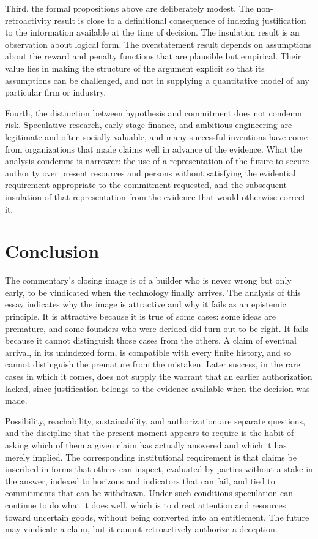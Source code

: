 \documentclass[11pt]{article}
\theoremstyle{plain}
\theoremstyle{definition}
\theoremstyle{remark}
\begin{document}
Third, the formal propositions above are deliberately modest. The non-retroactivity result is close to a definitional consequence of indexing justification to the information available at the time of decision. The insulation result is an observation about logical form. The overstatement result depends on assumptions about the reward and penalty functions that are plausible but empirical. Their value lies in making the structure of the argument explicit so that its assumptions can be challenged, and not in supplying a quantitative model of any particular firm or industry.

Fourth, the distinction between hypothesis and commitment does not condemn risk. Speculative research, early-stage finance, and ambitious engineering are legitimate and often socially valuable, and many successful inventions have come from organizations that made claims well in advance of the evidence. What the analysis condemns is narrower: the use of a representation of the future to secure authority over present resources and persons without satisfying the evidential requirement appropriate to the commitment requested, and the subsequent insulation of that representation from the evidence that would otherwise correct it.

\section{Conclusion}

The commentary's closing image is of a builder who is never wrong but only early, to be vindicated when the technology finally arrives. The analysis of this essay indicates why the image is attractive and why it fails as an epistemic principle. It is attractive because it is true of some cases: some ideas are premature, and some founders who were derided did turn out to be right. It fails because it cannot distinguish those cases from the others. A claim of eventual arrival, in its unindexed form, is compatible with every finite history, and so cannot distinguish the premature from the mistaken. Later success, in the rare cases in which it comes, does not supply the warrant that an earlier authorization lacked, since justification belongs to the evidence available when the decision was made.

Possibility, reachability, sustainability, and authorization are separate questions, and the discipline that the present moment appears to require is the habit of asking which of them a given claim has actually answered and which it has merely implied. The corresponding institutional requirement is that claims be inscribed in forms that others can inspect, evaluated by parties without a stake in the answer, indexed to horizons and indicators that can fail, and tied to commitments that can be withdrawn. Under such conditions speculation can continue to do what it does well, which is to direct attention and resources toward uncertain goods, without being converted into an entitlement. The future may vindicate a claim, but it cannot retroactively authorize a deception.
\end{document}
